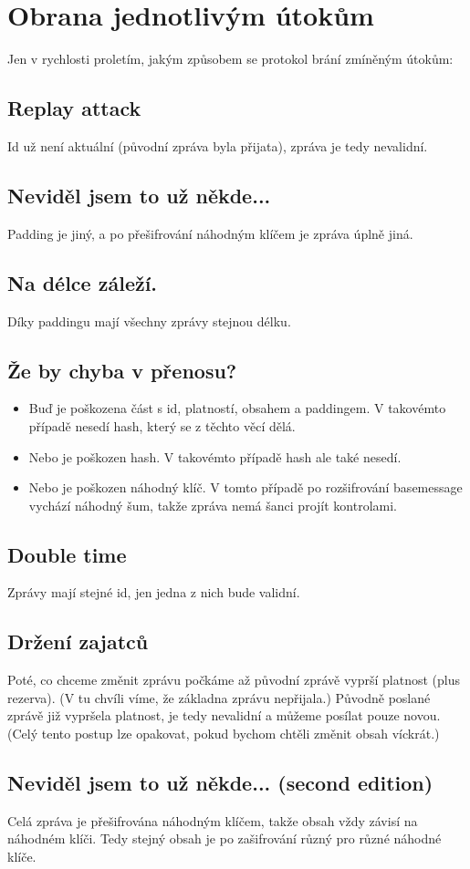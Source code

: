 \documentclass{article}
\begin{document}
\section{Obrana jednotlivým útokům}
Jen v rychlosti proletím, jakým způsobem se protokol brání zmíněným útokům:
\subsection{Replay attack}
Id už není aktuální (původní zpráva byla přijata), zpráva je tedy nevalidní.
\subsection{Neviděl jsem to už někde...}
Padding je jiný, a po přešifrování náhodným klíčem je zpráva úplně jiná.
\subsection{Na délce záleží.}
Díky paddingu mají všechny zprávy stejnou délku.
\subsection{Že by chyba v přenosu?}
\begin{itemize}
    \item Buď je poškozena část s id, platností, obsahem a paddingem. V takovémto případě nesedí hash, který se z těchto věcí dělá.
    \item Nebo je poškozen hash. V takovémto případě hash ale také nesedí.
    \item Nebo je poškozen náhodný klíč. V tomto případě po rozšifrování basemessage vychází náhodný šum, takže zpráva nemá šanci projít kontrolami.
\end{itemize}
\subsection{Double time}
Zprávy mají stejné id, jen jedna z nich bude validní.
\subsection{Držení zajatců}
Poté, co chceme změnit zprávu počkáme až původní zprávě vyprší platnost (plus rezerva). (V tu chvíli víme, že základna zprávu nepřijala.)
Původně poslané zprávě již vypršela platnost, je tedy nevalidní a můžeme posílat pouze novou. (Celý tento postup lze opakovat, pokud bychom chtěli změnit obsah víckrát.)
\subsection{Neviděl jsem to už někde... (second edition)}
Celá zpráva je přešifrována náhodným klíčem, takže obsah vždy závisí na náhodném klíči. Tedy stejný obsah je po zašifrování různý pro různé náhodné klíče.
\end{document}
